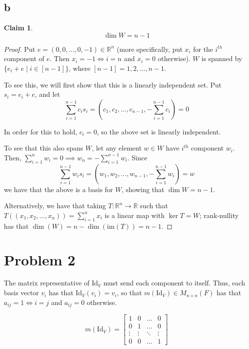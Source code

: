 \documentclass[12pt,letterpaper]{article}
\theoremstyle{definition}
\newtheorem*{claim}{Claim}
\newcommand{\R}{\mathbb{R}}
\newcommand{\id}{\mathrm{Id}}
\newcommand{\im}{\mathrm{im}}
\begin{document}
\subsection*{b}

\begin{claim}
  \[
    \dim W = n - 1
  \]
\end{claim}

\begin{proof}
  Put $e = (0, 0, ..., 0, -1) \in \R^n$ (more specifically, put $x_i$ for the
  $i^{th}$ component of $e$. Then $x_i = -1 \iff i = n$ and $x_i = 0$
  otherwise). $W$ is spanned by $\{e_i + e \mid i \in [n-1]\}$, where $[n-1] =
  1, 2, ..., n-1$.

  To see this, we will first show that this is a linearly independent set. Put
  $s_i = e_i + e$, and let
  \[
    \sum_{i=1}^{n-1} c_is_i = (c_1, c_2, ..., c_{n-1}, -\sum_{i=1}^{n-1}c_i) = 0
  \]
  
  In order for this to hold, $c_i = 0$, so the above set is linearly
  independent.

  To see that this also spans $W$, let any element $w \in W$ have $i^{th}$
  component $w_i$. Then, $\sum_{i=1}^nw_i = 0 \implies w_n =
  -\sum_{i=1}^{n-1}w_i$. Since
  \[
    \sum_{i=1}^{n-1} w_is_i = (w_1, w_2, ..., w_{n-1}, -\sum_{i=1}^{n-1}w_i) = w
  \]
  we have that the above is a basis for $W$, showing that $\dim W = n - 1$.

  Alternatively, we have that taking $T: \R^n \rightarrow \R$ such that $T((x_1,
  x_2, ..., x_n)) = \sum_{i=1}^nx_i$ is a linear map with $\ker{T} = W$;
  rank-nullity has that $\dim(W) = n - \dim(\im(T)) = n - 1$.
\end{proof}

\section*{Problem 2}

The matrix representative of $\id_V$ must send each component to itself. Thus,
each basis vector $v_i$ has that $\id_V(v_i) = v_i$, so that $m(\id_V) \in M_{n
  \times n}(F)$ has that $a_{ij} = 1 \iff i = j$ and $a_{ij} = 0$ otherwise.

\[
  m(\id_V) = \begin{bmatrix}
    1 & 0 & \dots & 0 \\
    0 & 1 & \dots & 0 \\
    \vdots & \vdots & \ddots & \vdots \\
    0 & 0 & \dots & 1
  \end{bmatrix}
\]
\end{document}
